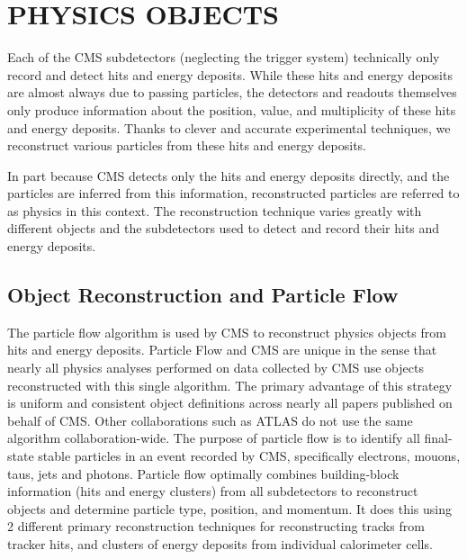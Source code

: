 %
%

\chapter{PHYSICS OBJECTS}
Each of the CMS subdetectors (neglecting the trigger system) technically only record and detect hits and energy deposits. While these hits and energy deposits are almost
always due to passing particles, the detectors and readouts themselves only produce information about the position, value, and multiplicity of
these hits and energy deposits. Thanks to clever and accurate experimental techniques, we reconstruct various particles from these hits and energy deposits.

In part because CMS detects only the hits and energy deposits directly, and the particles are inferred from this information,
reconstructed particles are referred to as physics  in this context.
The reconstruction technique varies greatly with different objects and the subdetectors used to detect and record their hits and energy deposits. 

\section{Object Reconstruction and Particle Flow}
The particle flow algorithm is used by CMS to reconstruct physics objects from hits and energy deposits. Particle Flow and CMS are unique in the sense
that nearly all physics analyses performed on data collected by CMS use objects reconstructed with this single algorithm. The primary advantage of this strategy is
uniform and consistent object definitions across nearly all papers published on behalf of CMS. Other collaborations such as ATLAS do not use
the same algorithm collaboration-wide. The purpose of particle flow is to identify all final-state stable particles in an event recorded by CMS, specifically electrons,
mouons, taus, jets and photons. Particle flow optimally combines building-block information (hits and energy clusters) from all subdetectors to reconstruct objects and
determine particle type, position, and momentum. It does this using 2 different primary reconstruction techniques for reconstructing tracks from tracker hits, and clusters
of energy deposits from individual calorimeter cells. 

